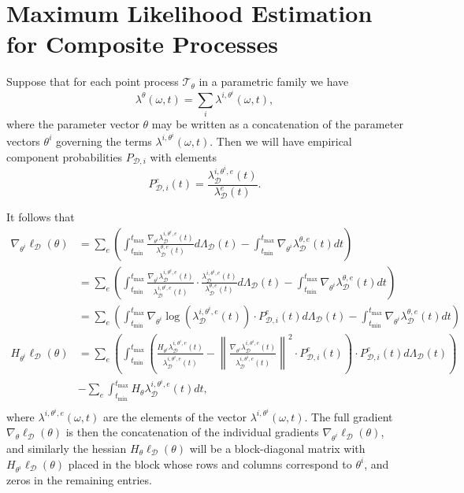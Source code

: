 \documentclass[honours,12pt]{unswthesis}
\numberwithin{equation}{section}
\begin{document}
\section{Maximum Likelihood Estimation for Composite Processes}
Suppose that for each point process $\mathcal{T}_\theta$ in a parametric family we have
$$\lambda^\theta(\omega,t)=\sum_i \lambda^{i,\theta^i}(\omega,t),$$
where the parameter vector $\theta$ may be written as a concatenation of the parameter vectors $\theta^i$ governing the terms $\lambda^{i,\theta^i}(\omega,t)$. Then we will have empirical component probabilities $P_{\mathcal{D},i}$ with elements
$$P_{\mathcal{D},i}^e(t) = \frac{\lambda_\mathcal{D}^{i,\theta^i,e}(t)}{\lambda_\mathcal{D}^e(t)}.$$

It follows that
\begin{equation}
	\begin{align}
		\nabla_{\theta^i} \ell_\mathcal{D}(\theta) &= \sum_e\left(\int_{t_\mathrm{min}}^{t_\mathrm{max}} \frac{\nabla_{\theta^i} \lambda_\mathcal{D}^{i,\theta^i,e}(t)}{\lambda_\mathcal{D}^{\theta,e}(t)} d\Lambda_\mathcal{D}(t)-\int_{t_\mathrm{min}}^{t_\mathrm{max}}\nabla_{\theta^i} \lambda_\mathcal{D}^{\theta,e}(t) dt\right) \\
		&= \sum_e\left(\int_{t_\mathrm{min}}^{t_\mathrm{max}} \frac{\nabla_{\theta^i} \lambda_\mathcal{D}^{i,\theta^i,e}(t)}{\lambda_\mathcal{D}^{i,\theta^i,e}(t)}\cdot\frac{\lambda_\mathcal{D}^{i,\theta^i,e}(t)}{\lambda_\mathcal{D}^{\theta,e}(t)} d\Lambda_\mathcal{D}(t)-\int_{t_\mathrm{min}}^{t_\mathrm{max}}\nabla_{\theta^i} \lambda_\mathcal{D}^{\theta,e}(t) dt\right) \\
		&= \sum_e\left(\int_{t_\mathrm{min}}^{t_\mathrm{max}} \nabla_{\theta^i} \log\left(\lambda_\mathcal{D}^{i,\theta^i,e}(t)\right)\cdot P_{\mathcal{D},i}^e(t) d\Lambda_\mathcal{D}(t)-\int_{t_\mathrm{min}}^{t_\mathrm{max}}\nabla_{\theta^i} \lambda_\mathcal{D}^{\theta,e}(t) dt\right) \\
		H_{\theta^i} \ell_\mathcal{D}(\theta) &= \sum_e\left(\int_{t_\mathrm{min}}^{t_\mathrm{max}} \left( \frac{H_{\theta^i} \lambda_\mathcal{D}^{i,\theta^i,e}(t)}{\lambda_\mathcal{D}^{i,\theta^i,e}(t)} - \left\|\frac{\nabla_{\theta^i}\lambda_\mathcal{D}^{i,\theta^i,e}(t)}{\lambda_\mathcal{D}^{i,\theta^i,e}(t)}\right\|^2 \cdot P_{\mathcal{D},i}^e(t)\right)\cdot P_{\mathcal{D},i}^e(t) d\Lambda_\mathcal{D}(t)\right) \\ &- \sum_e\int_{t_\mathrm{min}}^{t_\mathrm{max}} H_\theta \lambda_\mathcal{D}^{i,\theta^i,e}(t) dt,\\ 
	\end{align}
\end{equation}
where $\lambda^{i,\theta^i,e}(\omega,t)$ are the elements of the vector $\lambda^{i,\theta^i}(\omega,t)$. The full gradient $\nabla_\theta \ell_\mathcal{D}(\theta)$ is then the concatenation of the individual gradients $\nabla_{\theta^i} \ell_\mathcal{D}(\theta)$, and similarly the hessian $H_\theta \ell_\mathcal{D}(\theta)$ will be a block-diagonal matrix with $H_{\theta^i}\ell_\mathcal{D}(\theta)$ placed in the block whose rows and columns correspond to $\theta^i$, and zeros in the remaining entries.
\end{document}
